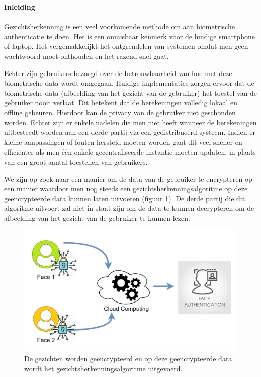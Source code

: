 \textbf{\Large{Inleiding}}\\\\
Gezichtsherkenning is een veel voorkomende methode om aan biometrische authenticatie te doen. Het is een onmisbaar kenmerk voor de huidige smartphone of laptop. Het vergemakkelijkt het ontgrendelen van systemen omdat men geen wachtwoord moet onthouden en het razend snel gaat.

Echter zijn gebruikers bezorgd over de betrouwbaarheid van hoe met deze biometrische data wordt omgegaan. Huidige implementaties zorgen ervoor dat de biometrische data (afbeelding van het gezicht van de gebruiker) het toestel van de gebruiker nooit verlaat. Dit betekent dat de berekeningen volledig lokaal en offline gebeuren. Hierdoor kan de privacy van de gebruiker niet geschonden worden. Echter zijn er enkele nadelen die men niet heeft wanneer de berekeningen uitbesteedt worden aan een derde partij via een gedistribueerd  systeem. Indien er kleine aanpassingen of fouten hersteld moeten worden gaat dit veel sneller en effici\"enter als men \'e\'en enkele gecentraliseerde instantie moeten updaten, in plaats van een groot aantal toestellen van gebruikers.

We zijn op zoek naar een manier om de data van de gebruiker te encrypteren op een manier waardoor men nog steeds een gezichtsherkenningsalgoritme op deze ge\"encrypteerde data kunnen laten uitvoeren (figuur \ref{fig:dutch_intro_overview}). De derde partij die dit algoritme uitvoert zal niet in staat zijn om de data te kunnen decrypteren om de afbeelding van het gezicht van de gebruiker te kunnen lezen.

\begin{figure}[H]
  \includegraphics[scale=0.4]{fig/intro_overview.png}
  \centering
  \caption{De gezichten worden ge\"encrypteerd  en op deze ge\"encrypteerde data wordt het gezichtsherkenningsalgoritme uitgevoerd.}
  \label{fig:dutch_intro_overview}
\end{figure}

